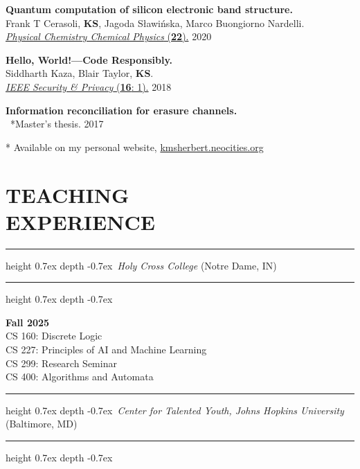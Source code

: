 \documentclass[marginmode, 10pt]{res} %
\newcommand{\me}{\textbf{KS}}       %
\def\Vhrulefill{\leavevmode\leaders\hrule height 0.7ex depth \dimexpr0.4pt-0.7ex\hfill\kern0pt}         %
\begin{document}
\begin{resume}
\textbf{Quantum computation of silicon electronic band structure.} \\
    Frank T Cerasoli, \me, Jagoda S\l{}awi\'nska, Marco Buongiorno Nardelli. \\
    \href{https://arxiv.org/abs/2006.03807}{\textit{Physical Chemistry Chemical Physics} (\textbf{22}).} \hfill 2020

\textbf{Hello, World!—Code Responsibly.} \\
    Siddharth Kaza, Blair Taylor, \me. \\
    \href{https://ieeexplore.ieee.org/document/8283486}{\textit{IEEE Security \& Privacy} (\textbf{16}: 1).} \hfill 2018

\textbf{Information reconciliation for erasure channels.} \\
    ~*Master's thesis. \hfill 2017

* Available on my personal website, \href{kmsherbert.neocities.org}{kmsherbert.neocities.org}


\pagebreak

\section{\small{TEACHING\\EXPERIENCE}}

\Vhrulefill ~\textit{Holy Cross College} (Notre Dame, IN)~ \Vhrulefill

\textbf{Fall 2025} \\
CS 160: Discrete Logic \\
CS 227: Principles of AI and Machine Learning \\
CS 299: Research Seminar \\
CS 400: Algorithms and Automata \\

\Vhrulefill ~\textit{Center for Talented Youth, Johns Hopkins University} (Baltimore, MD)~ \Vhrulefill


\end{resume}
\end{document}
